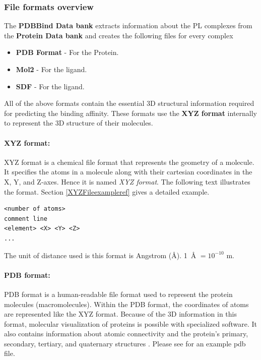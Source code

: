 \documentclass[11pt]{article}
\begin{document}
\subsubsection{File formats overview}
The \textbf{PDBBind Data bank} extracts information about the PL complexes from the \textbf{Protein Data bank} and creates the following files for every complex
\begin{itemize}
\item \textbf{PDB Format} - For the Protein.
\item  \textbf{Mol2} - For the ligand.
\item \textbf{SDF} - For the ligand.
\end{itemize}

All of the above formats contain the essential 3D structural information required for predicting the binding affinity.
These formats use the \textbf{XYZ format} internally to represent the 3D structure of their molecules.

\paragraph{XYZ format:}
\label{xyz_format}
XYZ format is a chemical file format that represents the geometry of a molecule.
It specifies the atoms in a molecule along with their cartesian coordinates in the X, Y, and Z-axes.
Hence it is named \textit{XYZ format}.
The following text illustrates the format.
Section \ref{XYZFileexampleref} gives a detailed example.
\cite{XYZ_format}
\begin{verbatim}
<number of atoms>
comment line
<element> <X> <Y> <Z>
...
\end{verbatim}

The unit of distance used is this format is Angstrom (\si{\angstrom}).  \SI{1}{\angstrom} $ = 10^{-10}$ m.
\cite{XYZ_format}

\paragraph{PDB format:}
PDB format is a human-readable file format used to represent the protein molecules (macromolecules).
Within the PDB format,  the coordinates of atoms are represented like the XYZ format.
Because of the 3D information in this format,  molecular visualization of proteins is possible with specialized software. 
It also contains information about atomic connectivity and the protein's primary,  secondary,  tertiary,  and quaternary structures
\cite{pdb_file_format}
\cite{understanding_pdb_format}.
Please see \cite{examplePDBFile} for an example pdb file.
\end{document}
